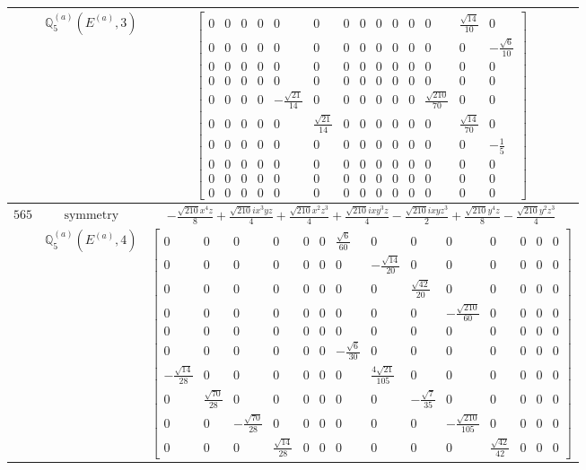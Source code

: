 \documentclass[fleqn,8pt,landscape]{jsarticle}
\begin{document}
\begin{longtable}{ccc}
$  $ & $ \mathbb{Q}_{5}^{(a)}(E^{(a)},3) $ & $ \begin{bmatrix} 0 & 0 & 0 & 0 & 0 & 0 & 0 & 0 & 0 & 0 & 0 & 0 & \frac{\sqrt{14}}{10} & 0 \\ 0 & 0 & 0 & 0 & 0 & 0 & 0 & 0 & 0 & 0 & 0 & 0 & 0 & - \frac{\sqrt{6}}{10} \\ 0 & 0 & 0 & 0 & 0 & 0 & 0 & 0 & 0 & 0 & 0 & 0 & 0 & 0 \\ 0 & 0 & 0 & 0 & 0 & 0 & 0 & 0 & 0 & 0 & 0 & 0 & 0 & 0 \\ 0 & 0 & 0 & 0 & - \frac{\sqrt{21}}{14} & 0 & 0 & 0 & 0 & 0 & 0 & \frac{\sqrt{210}}{70} & 0 & 0 \\ 0 & 0 & 0 & 0 & 0 & \frac{\sqrt{21}}{14} & 0 & 0 & 0 & 0 & 0 & 0 & \frac{\sqrt{14}}{70} & 0 \\ 0 & 0 & 0 & 0 & 0 & 0 & 0 & 0 & 0 & 0 & 0 & 0 & 0 & - \frac{1}{5} \\ 0 & 0 & 0 & 0 & 0 & 0 & 0 & 0 & 0 & 0 & 0 & 0 & 0 & 0 \\ 0 & 0 & 0 & 0 & 0 & 0 & 0 & 0 & 0 & 0 & 0 & 0 & 0 & 0 \\ 0 & 0 & 0 & 0 & 0 & 0 & 0 & 0 & 0 & 0 & 0 & 0 & 0 & 0 \end{bmatrix} $ \\ \hline
$ 565 $ & $ \text{symmetry} $ & $ - \frac{\sqrt{210} x^{4} z}{8} + \frac{\sqrt{210} i x^{3} y z}{4} + \frac{\sqrt{210} x^{2} z^{3}}{4} + \frac{\sqrt{210} i x y^{3} z}{4} - \frac{\sqrt{210} i x y z^{3}}{2} + \frac{\sqrt{210} y^{4} z}{8} - \frac{\sqrt{210} y^{2} z^{3}}{4} $ \\
$  $ & $ \mathbb{Q}_{5}^{(a)}(E^{(a)},4) $ & $ \begin{bmatrix} 0 & 0 & 0 & 0 & 0 & 0 & \frac{\sqrt{6}}{60} & 0 & 0 & 0 & 0 & 0 & 0 & 0 \\ 0 & 0 & 0 & 0 & 0 & 0 & 0 & - \frac{\sqrt{14}}{20} & 0 & 0 & 0 & 0 & 0 & 0 \\ 0 & 0 & 0 & 0 & 0 & 0 & 0 & 0 & \frac{\sqrt{42}}{20} & 0 & 0 & 0 & 0 & 0 \\ 0 & 0 & 0 & 0 & 0 & 0 & 0 & 0 & 0 & - \frac{\sqrt{210}}{60} & 0 & 0 & 0 & 0 \\ 0 & 0 & 0 & 0 & 0 & 0 & 0 & 0 & 0 & 0 & 0 & 0 & 0 & 0 \\ 0 & 0 & 0 & 0 & 0 & 0 & - \frac{\sqrt{6}}{30} & 0 & 0 & 0 & 0 & 0 & 0 & 0 \\ - \frac{\sqrt{14}}{28} & 0 & 0 & 0 & 0 & 0 & 0 & \frac{4 \sqrt{21}}{105} & 0 & 0 & 0 & 0 & 0 & 0 \\ 0 & \frac{\sqrt{70}}{28} & 0 & 0 & 0 & 0 & 0 & 0 & - \frac{\sqrt{7}}{35} & 0 & 0 & 0 & 0 & 0 \\ 0 & 0 & - \frac{\sqrt{70}}{28} & 0 & 0 & 0 & 0 & 0 & 0 & - \frac{\sqrt{210}}{105} & 0 & 0 & 0 & 0 \\ 0 & 0 & 0 & \frac{\sqrt{14}}{28} & 0 & 0 & 0 & 0 & 0 & 0 & \frac{\sqrt{42}}{42} & 0 & 0 & 0 \end{bmatrix} $ \\ \hline

\end{longtable}
\end{document}
